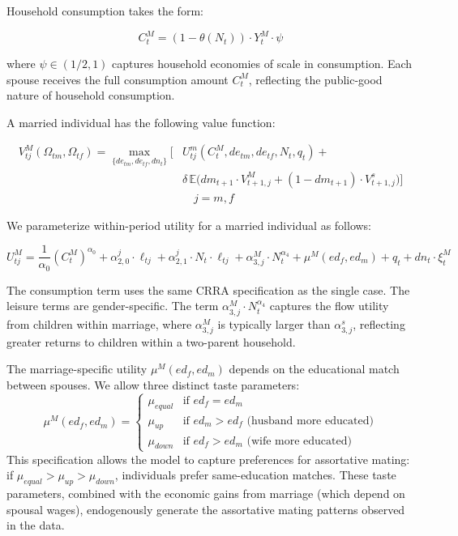 \documentclass[12pt]{article}
\begin{document}
Household consumption takes the form:

\begin{equation}
C_t^M = (1 - \theta(N_t)) \cdot Y_t^M \cdot \psi
\label{eq:married_consumption}
\end{equation}

where $\psi \in (1/2, 1)$ captures household economies of scale in consumption. Each spouse receives the full consumption amount $C_t^M$, reflecting the public-good nature of household consumption.

A married individual has the following value function:

\begin{equation}
\begin{aligned}
V_{tj}^M(\Omega_{tm}, \Omega_{tf}) = \max_{\{de_{tm}, de_{tf}, dn_t\}} \Big[ &U_{tj}^m(C_t^M, de_{tm}, de_{tf}, N_t, q_t) + \\
&\delta \, \mathbb{E}\big(dm_{t+1} \cdot V_{t+1,j}^M + (1 - dm_{t+1}) \cdot V_{t+1,j}^s\big) \Big] \\
&\quad j = m, f
\end{aligned}
\label{eq:married_value}
\end{equation}

We parameterize within-period utility for a married individual as follows:

\begin{equation}
U_{tj}^M = \frac{1}{\alpha_0}(C_t^M)^{\alpha_0} + \alpha_{2,0}^j \cdot \ell_{tj} + \alpha_{2,1}^j \cdot N_t \cdot \ell_{tj} + \alpha_{3,j}^M \cdot N_t^{\alpha_4} + \mu^M(ed_f, ed_m) + q_t + dn_t \cdot \xi_t^M
\label{eq:married_utility}
\end{equation}

The consumption term uses the same CRRA specification as the single case. The leisure terms are gender-specific. The term $\alpha_{3,j}^M \cdot N_t^{\alpha_4}$ captures the flow utility from children within marriage, where $\alpha_{3,j}^M$ is typically larger than $\alpha_{3,j}^s$, reflecting greater returns to children within a two-parent household.

The marriage-specific utility $\mu^M(ed_f, ed_m)$ depends on the educational match between spouses. We allow three distinct taste parameters:
\begin{equation}
\mu^M(ed_f, ed_m) = \begin{cases}
\mu_{equal} & \text{if } ed_f = ed_m \\
\mu_{up} & \text{if } ed_m > ed_f \text{ (husband more educated)} \\
\mu_{down} & \text{if } ed_f > ed_m \text{ (wife more educated)}
\end{cases}
\label{eq:marriage_taste}
\end{equation}
This specification allows the model to capture preferences for assortative mating: if $\mu_{equal} > \mu_{up} > \mu_{down}$, individuals prefer same-education matches. These taste parameters, combined with the economic gains from marriage (which depend on spousal wages), endogenously generate the assortative mating patterns observed in the data.
\end{document}
